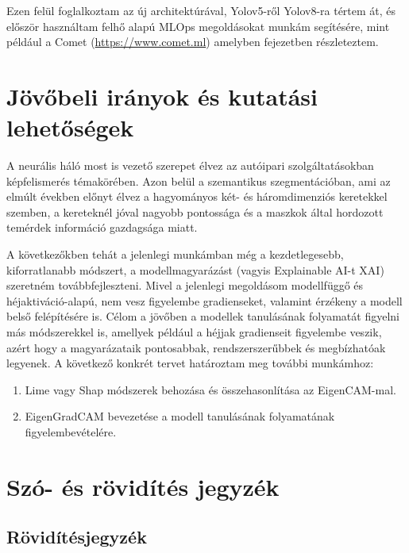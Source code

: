 \documentclass[12pt,oneside,a4paper]{article}
\newcommand{\newsection}[1]{\clearpage\section{#1}}\label{makro}
\theoremstyle{remark}
\begin{document}
    Ezen felül foglalkoztam az új architektúrával, Yolov5-ről Yolov8-ra tértem át, és először használtam felhő alapú
    MLOps megoldásokat munkám segítésére, mint például a Comet (\url{https://www.comet.ml}) amelyben  fejezetben
    részleteztem.

\newsection{Jövőbeli irányok és kutatási lehetőségek}\label{sec:jovobeli-iranyok-es-kutatasi-lehetosegek}
    A  neurális háló most is vezető szerepet élvez az autóipari szolgáltatásokban képfelismerés
    témakörében.
    Azon belül a szemantikus szegmentációban, ami az elmúlt években előnyt élvez
    a hagyományos  két- és háromdimenziós keretekkel szemben, a kereteknél jóval nagyobb pontossága
    és a maszkok által hordozott temérdek információ gazdagsága miatt.

    A következőkben tehát a jelenlegi munkámban még a kezdetlegesebb, kiforratlanabb módszert, a modellmagyarázást
    (vagyis Explainable AI-t
    \ac{XAI}) szeretném továbbfejleszteni.
    Mivel a jelenlegi megoldásom modellfüggő és héjaktiváció-alapú, nem vesz figyelembe gradienseket,
    valamint érzékeny a modell belső felépítésére is.
    Célom a jövőben a modellek tanulásának folyamatát figyelni más módszerekkel is, amellyek például a héjjak gradienseit
    figyelembe veszik, azért hogy a magyarázataik pontosabbak, rendszerszerűbbek és megbízhatóak legyenek.
    A következő konkrét tervet határoztam meg további munkámhoz:
    \begin{enumerate}
        \item Lime vagy Shap módszerek behozása és összehasonlítása az EigenCAM-mal.
               \cite{ribeiro-etal-2016-trust,lundberg2017unified}
        \item EigenGradCAM bevezetése a modell tanulásának folyamatának figyelembevételére.
    \end{enumerate}


\printindex\label{ossz:indexjegyzek}

\newsection{Szó- és rövidítés jegyzék}\label{sec:szó-es-rövidités-jegyzék}
\printglossary\label{ossz:glossary}
\newpage
\subsection{Rövidítésjegyzék}\label{subsec:röviditésjegyzék}
\begin{acronym}\label{ossz:roviditesjegyzek}
\end{acronym}
\newpage

\label{ossz:irodalomjegyzek}
\end{document}
